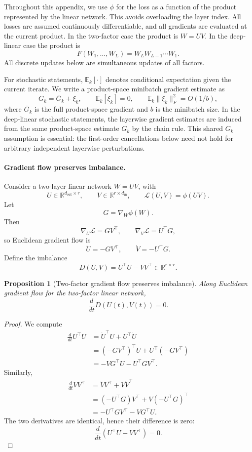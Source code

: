 \documentclass{article}
\newtheorem{proposition}{Proposition}
\newcommand{\R}{\mathbb{R}}
\newcommand{\Loss}{\mathcal{L}}
\begin{document}
Throughout this appendix, we use \(\phi\) for the loss as a function of
the product represented by the linear network. This avoids overloading
the layer index.  All losses are assumed continuously differentiable, and
all gradients are evaluated at the current product.  In the two-factor
case the product is \(W=UV\).  In the deep-linear case the product is
\[
    F(W_1,\ldots,W_L)=W_LW_{L-1}\cdots W_1 .
\]
All discrete updates below are simultaneous updates of all factors.

For stochastic statements, \(\mathbb E_k[\cdot]\) denotes conditional
expectation given the current iterate.  We write a product-space
minibatch gradient estimate as
\[
    G_k=\bar G_k+\xi_k,
    \qquad
    \mathbb E_k[\xi_k]=0,
    \qquad
    \mathbb E_k\|\xi_k\|_F^2=O(1/b),
\]
where \(\bar G_k\) is the full product-space gradient and \(b\) is the
minibatch size.  In the deep-linear stochastic statements, the layerwise
gradient estimates are induced from the same product-space estimate
\(G_k\) by the chain rule.  This shared \(G_k\) assumption is essential:
the first-order cancellations below need not hold for arbitrary
independent layerwise perturbations.

\paragraph{Gradient flow preserves imbalance.}
Consider a two-layer linear network \(W=UV\), with
\[
    U\in\R^{d_{\mathrm{out}}\times r},
    \qquad
    V\in\R^{r\times d_{\mathrm{in}}},
    \qquad
    \Loss(U,V)=\phi(UV).
\]
Let
\[
    G=\nabla_W\phi(W).
\]
Then
\[
    \nabla_U\Loss=GV^\top,
    \qquad
    \nabla_V\Loss=U^\top G,
\]
so Euclidean gradient flow is
\[
    \dot U=-GV^\top,
    \qquad
    \dot V=-U^\top G.
\]
Define the imbalance
\[
    D(U,V)
    =
    U^\top U - VV^\top
    \in \R^{r\times r}.
\]

\begin{proposition}[Two-factor gradient flow preserves imbalance]
Along Euclidean gradient flow for the two-factor linear network,
\[
    \frac{d}{dt}D(U(t),V(t))=0.
\]
\end{proposition}

\begin{proof}
We compute
\[
\begin{aligned}
    \frac{d}{dt}U^\top U
    &=
    \dot U^\top U+U^\top\dot U  \\
    &=
    (-GV^\top)^\top U+U^\top(-GV^\top) \\
    &=
    -VG^\top U-U^\top G V^\top .
\end{aligned}
\]
Similarly,
\[
\begin{aligned}
    \frac{d}{dt}VV^\top
    &=
    \dot V V^\top+V\dot V^\top  \\
    &=
    (-U^\top G)V^\top+V(-U^\top G)^\top \\
    &=
    -U^\top G V^\top - V G^\top U .
\end{aligned}
\]
The two derivatives are identical, hence their difference is zero:
\[
    \frac{d}{dt}
    \left(
        U^\top U - VV^\top
    \right)
    =
    0.
\]
\end{proof}
\end{document}
